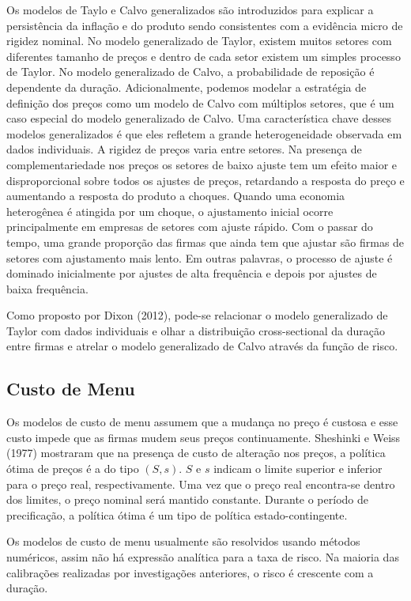 \documentclass[twoside,a4paper,11pt]{report}
\begin{document}
Os modelos de Taylo e Calvo generalizados são introduzidos para explicar a persistência da inflação e do produto sendo consistentes com a evidência micro de rigidez nominal. No modelo generalizado de Taylor, existem muitos setores com diferentes tamanho de preços e dentro de cada setor existem um simples processo de Taylor. No modelo generalizado de Calvo, a probabilidade de reposição é dependente da duração. Adicionalmente, podemos modelar a estratégia de definição dos preços como um modelo de Calvo com múltiplos setores, que é um caso especial do modelo generalizado de Calvo. Uma característica chave desses modelos generalizados é que eles refletem a grande heterogeneidade observada em dados individuais. A rigidez de preços varia entre setores. Na presença de complementariedade nos preços os setores de baixo ajuste tem um efeito maior e disproporcional sobre todos os ajustes de preços, retardando a resposta do preço e aumentando a resposta do produto a choques. Quando uma economia heterogênea é atingida por um choque, o ajustamento inicial ocorre principalmente em empresas de setores com ajuste rápido. Com o passar do tempo, uma grande proporção das firmas que ainda tem que ajustar são firmas de setores com ajustamento mais lento. Em outras palavras, o processo de ajuste é dominado inicialmente por ajustes de alta frequência e depois por ajustes de baixa frequência. 

Como proposto por Dixon (2012), pode-se relacionar o modelo generalizado de Taylor com dados individuais e olhar a distribuição cross-sectional da duração entre firmas e atrelar o modelo generalizado de Calvo através da função de risco. 

\subsection*{Custo de Menu}

Os modelos de custo de menu assumem que a mudança no preço é custosa e esse custo impede que as firmas mudem seus preços continuamente. Sheshinki e Weiss (1977) mostraram que na presença de custo de alteração nos preços, a política ótima de preços é a do tipo $(S,s)$. $S$ e $s$ indicam o limite superior e inferior para o preço real, respectivamente. Uma vez que o preço real encontra-se dentro dos limites, o preço nominal será mantido constante. Durante o período de precificação, a política ótima é um tipo de política estado-contingente.

Os modelos de custo de menu usualmente são resolvidos usando métodos numéricos, assim não há expressão analítica para a taxa de risco. Na maioria das calibrações realizadas por investigações anteriores, o risco é crescente com a duração.
\end{document}
